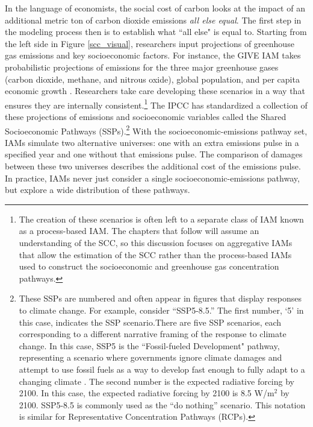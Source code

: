 In the language of economists, the social cost of carbon looks at the impact of an additional metric ton of carbon dioxide emissions \emph{all else equal}. The first step in the modeling process then is to establish what ``all else" is equal to. Starting from the left side in Figure \ref{scc_visual}, researchers input projections of greenhouse gas emissions and key socioeconomic factors. For instance, the GIVE IAM takes probabilistic projections of emissions for the three major greenhouse gases (carbon dioxide, methane, and nitrous oxide), global population, and per capita economic growth \citep{rennert2022comprehensive}. Researchers take care developing these scenarios in a way that ensures they are internally consistent.\footnote{The creation of these scenarios is often left to a separate class of IAM known as a process-based IAM. The chapters that follow will assume an understanding of the SCC, so this discussion focuses on aggregative IAMs that allow the estimation of the SCC rather than the process-based IAMs used to construct the socioeconomic and greenhouse gas concentration pathways.} The IPCC has standardized a collection of these projections of emissions and socioeconomic variables called the Shared Socioeconomic Pathways (SSPs).\footnote{These SSPs are numbered and often appear in figures that display responses to climate change. For example, consider ``SSP5-8.5.'' The first number, `5' in this case, indicates the SSP scenario.There are five SSP scenarios, each corresponding to a different narrative framing of the response to climate change. In this case, SSP5 is the ``Fossil-fueled Development" pathway, representing a scenario where governments ignore climate damages and attempt to use fossil fuels as a way to develop fast enough to fully adapt to a changing climate \citep{hausfather2018explainer}. The second number is the expected radiative forcing by 2100. In this case, the expected radiative forcing by 2100 is 8.5 W/m$^2$ by 2100. SSP5-8.5 is commonly used as the ``do nothing'' scenario. This notation is similar for Representative Concentration Pathways (RCPs).} With the socioeconomic-emissions pathway set, IAMs simulate two alternative universes: one with an extra emissions pulse in a specified year and one without that emissions pulse. The comparison of damages between these two universes describes the additional cost of the emissions pulse. In practice, IAMs never just consider a single socioeconomic-emissions pathway, but explore a wide distribution of these pathways.

